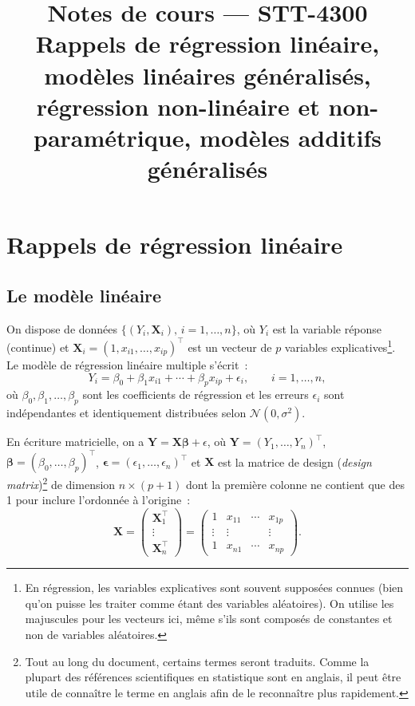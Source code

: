 \documentclass[11pt,letterpaper]{article}
\title{\textbf{Notes de cours --- STT-4300}\\[1ex]
Rappels de régression linéaire, modèles linéaires généralisés,\\
régression non-linéaire et non-paramétrique, modèles additifs généralisés}
\author{}
\date{}
\begin{document}
\maketitle
\tableofcontents
\newpage

\section{Rappels de régression linéaire}

\subsection{Le modèle linéaire}

On dispose de données $\{(Y_i, \boldsymbol{X}_i),\, i=1,\ldots,n\}$, où $Y_i$ est la variable réponse (continue) et $\boldsymbol{X}_i=(1,x_{i1},\ldots,x_{ip})^\top$ est un vecteur de $p$ variables explicatives\footnote{En régression, les variables explicatives sont souvent supposées connues (bien qu'on puisse les traiter comme étant des variables aléatoires). On utilise les majuscules pour les vecteurs ici, même s'ils sont composés de constantes et non de variables aléatoires.}. Le modèle de régression linéaire multiple s'écrit~:
$$Y_i = \beta_0 + \beta_1 x_{i1} + \cdots + \beta_p x_{ip} + \epsilon_i, \qquad i=1,\ldots,n,$$
où $\beta_0,\beta_1,\ldots,\beta_p$ sont les coefficients de régression et les erreurs $\epsilon_i$ sont indépendantes et identiquement distribuées selon $\mathcal{N}(0,\sigma^2)$.

En écriture matricielle, on a $\boldsymbol{Y} = \boldsymbol{X\beta} + \epsilon$, où $\boldsymbol{Y}=(Y_1,\ldots,Y_n)^\top$, $\boldsymbol{\beta}=(\beta_0,\ldots,\beta_p)^\top$, $\boldsymbol{\epsilon}=(\epsilon_1,\ldots,\epsilon_n)^\top$ et $\boldsymbol{X}$ est la matrice de design (\textit{design matrix})\footnote{Tout au long du document, certains termes seront traduits. Comme la plupart des références scientifiques en statistique sont en anglais, il peut être utile de connaître le terme en anglais afin de le reconnaître plus rapidement.} de dimension $n\times(p+1)$ dont la première colonne ne contient que des 1 pour inclure l'ordonnée à l'origine~:
$$\boldsymbol{X} =
 \begin{pmatrix}  \boldsymbol{X}_1^\top \\  \vdots  \\   \boldsymbol{X}_n^\top\end{pmatrix}=\begin{pmatrix} 1 & x_{11} & \cdots & x_{1p} \\ \vdots & \vdots & & \vdots \\ 1 & x_{n1} & \cdots & x_{np}\end{pmatrix}.$$
\end{document}

